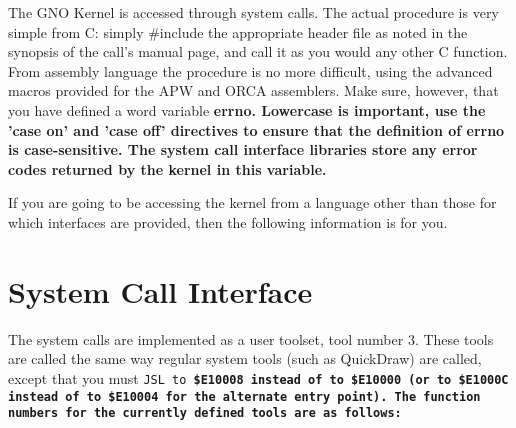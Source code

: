 \documentclass{report}
\begin{document}
The GNO Kernel is accessed through system
calls. The actual procedure is very simple from C: simply
\#include the appropriate header file as noted in the synopsis of
the call's manual page, and call it as you would any other C
function. From 
assembly language the procedure is no more
difficult, using the advanced macros provided for the  APW and
ORCA assemblers. Make sure, however, that you have defined a word
variable \bf errno\rm. Lowercase is important, use the 'case on'
and 'case off' directives to ensure that the definition of \bf errno \rm
is case-sensitive. The system call interface libraries store any
error codes returned by the kernel in this variable.

If you are going to be accessing the kernel
from a language other than those for which interfaces are
provided, then the following information is for you.

\section{System Call Interface}

The system calls are implemented as a user toolset, tool number 3.
These tools are called the same way regular system tools (such as QuickDraw)
are called, except that you must \tt JSL \rm to \bf \$E10008 \rm
instead of to \bf \$E10000 \rm (or to \bf \$E1000C \rm instead of
to \bf \$E10004 \rm  for the alternate entry point). The function
numbers for the currently defined tools are as follows:
\end{document}
